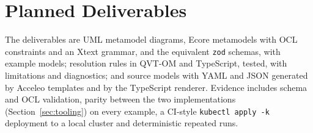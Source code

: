 \section{Planned Deliverables}
\label{sec:deliverables}

The deliverables are UML metamodel diagrams, Ecore metamodels with OCL
constraints and an Xtext grammar, and the equivalent \texttt{zod} schemas, with
example models; resolution rules in QVT-OM and TypeScript, tested, with
limitations and diagnostics; and source models with YAML and JSON generated by
Acceleo templates and by the TypeScript renderer. Evidence includes schema and
OCL validation, parity between the two implementations (Section~\ref{sec:tooling}) on every
example, a
CI-style \texttt{kubectl apply -k} deployment to a local
cluster and deterministic repeated runs.
